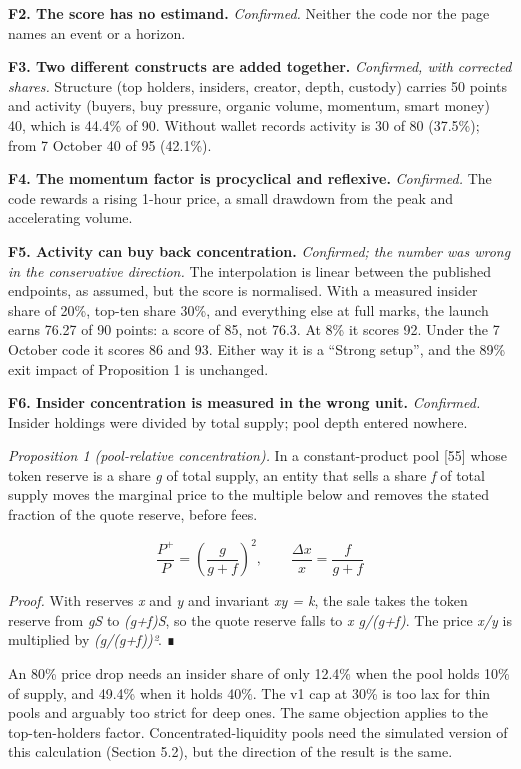 \textbf{F2. The score has no estimand.} \emph{Confirmed.} Neither the code nor the page names an event or a horizon.

\textbf{F3. Two different constructs are added together.} \emph{Confirmed, with corrected shares.} Structure (top holders, insiders, creator, depth, custody) carries 50 points and activity (buyers, buy pressure, organic volume, momentum, smart money) 40, which is 44.4\% of 90. Without wallet records activity is 30 of 80 (37.5\%); from 7 October 40 of 95 (42.1\%).

\textbf{F4. The momentum factor is procyclical and reflexive.} \emph{Confirmed.} The code rewards a rising 1-hour price, a small drawdown from the peak and accelerating volume.

\textbf{F5. Activity can buy back concentration.} \emph{Confirmed; the number was wrong in the conservative direction.} The interpolation is linear between the published endpoints, as assumed, but the score is normalised. With a measured insider share of 20\%, top-ten share 30\%, and everything else at full marks, the launch earns 76.27 of 90 points: a score of 85, not 76.3. At 8\% it scores 92. Under the 7 October code it scores 86 and 93. Either way it is a ``Strong setup'', and the 89\% exit impact of Proposition 1 is unchanged.

\textbf{F6. Insider concentration is measured in the wrong unit.} \emph{Confirmed.} Insider holdings were divided by total supply; pool depth entered nowhere.

\emph{Proposition 1 (pool-relative concentration).} In a constant-product pool {[}55{]} whose token reserve is a share \emph{g} of total supply, an entity that sells a share \emph{f} of total supply moves the marginal price to the multiple below and removes the stated fraction of the quote reserve, before fees.

\[
\frac{P^{+}}{P} = \left(\frac{g}{g+f}\right)^{2}, \qquad \frac{\Delta x}{x} = \frac{f}{g+f}
\]

\emph{Proof.} With reserves \emph{x} and \emph{y} and invariant \emph{xy = k}, the sale takes the token reserve from \emph{gS} to \emph{(g+f)S}, so the quote reserve falls to \emph{x g/(g+f)}. The price \emph{x/y} is multiplied by \emph{(g/(g+f))²}. ∎



An 80\% price drop needs an insider share of only 12.4\% when the pool holds 10\% of supply, and 49.4\% when it holds 40\%. The v1 cap at 30\% is too lax for thin pools and arguably too strict for deep ones. The same objection applies to the top-ten-holders factor. Concentrated-liquidity pools need the simulated version of this calculation (Section 5.2), but the direction of the result is the same.

